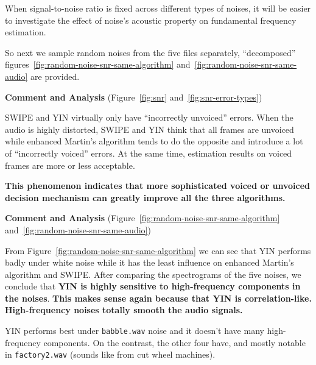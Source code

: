 \documentclass[11pt,a4paper,titlepage]{article}
\begin{document}
When signal-to-noise ratio is fixed across different types of noises, it will be easier to investigate the effect of noise's acoustic property on fundamental frequency estimation.

So next we sample random noises from the five files separately, \enquote{decomposed} figures~\ref{fig:random-noise-snr-same-algorithm} and~\ref{fig:random-noise-snr-same-audio} are provided.

\begin{mdframed}
\textbf{Comment and Analysis} (Figure~\ref{fig:snr} and~\ref{fig:snr-error-types})

\bigskip

SWIPE and YIN virtually only have \enquote{incorrectly unvoiced} errors.
When the audio is highly distorted, SWIPE and YIN think that all frames are unvoiced while enhanced Martin's algorithm tends to do the opposite and introduce a lot of \enquote{incorrectly voiced} errors.
At the same time, estimation results on voiced frames are more or less acceptable.

\textbf{This phenomenon indicates that more sophisticated voiced or unvoiced decision mechanism can greatly improve all the three algorithms.}
\end{mdframed}

\begin{mdframed}
\textbf{Comment and Analysis} (Figure~\ref{fig:random-noise-snr-same-algorithm} and~\ref{fig:random-noise-snr-same-audio})

From Figure~\ref{fig:random-noise-snr-same-algorithm} we can see that YIN performs badly under white noise while it has the least influence on enhanced Martin's algorithm and SWIPE\@.
After comparing the spectrograms of the five noises, we conclude that \textbf{YIN is highly sensitive to high-frequency components in the noises}.
\textbf{This makes sense again because that YIN is correlation-like.
High-frequency noises totally smooth the audio signals.}

YIN performs best under \texttt{babble.wav} noise and it doesn't have many high-frequency components.
On the contrast, the other four have, and mostly notable in \texttt{factory2.wav} (sounds like from cut wheel machines).
\end{mdframed}
\end{document}
